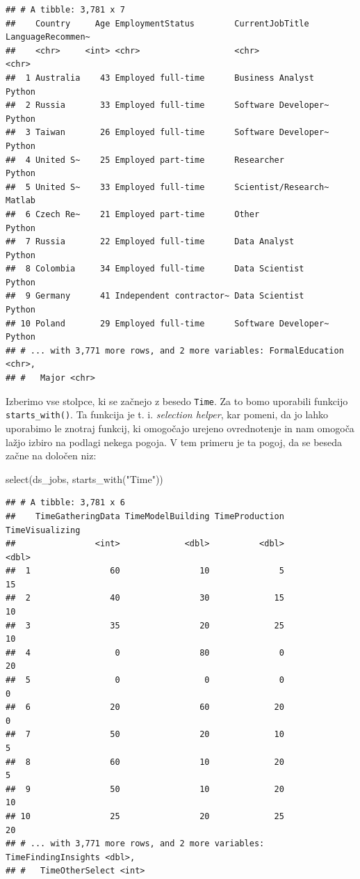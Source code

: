 \documentclass[
]{book}
\newenvironment{Shaded}{\begin{snugshade}}{\end{snugshade}}
\newcommand{\FunctionTok}[1]{\textcolor[rgb]{0.00,0.00,0.00}{#1}}
\newcommand{\NormalTok}[1]{#1}
\newcommand{\StringTok}[1]{\textcolor[rgb]{0.31,0.60,0.02}{#1}}
\begin{document}
\begin{verbatim}
## # A tibble: 3,781 x 7
##    Country     Age EmploymentStatus        CurrentJobTitle     LanguageRecommen~
##    <chr>     <int> <chr>                   <chr>               <chr>            
##  1 Australia    43 Employed full-time      Business Analyst    Python           
##  2 Russia       33 Employed full-time      Software Developer~ Python           
##  3 Taiwan       26 Employed full-time      Software Developer~ Python           
##  4 United S~    25 Employed part-time      Researcher          Python           
##  5 United S~    33 Employed full-time      Scientist/Research~ Matlab           
##  6 Czech Re~    21 Employed part-time      Other               Python           
##  7 Russia       22 Employed full-time      Data Analyst        Python           
##  8 Colombia     34 Employed full-time      Data Scientist      Python           
##  9 Germany      41 Independent contractor~ Data Scientist      Python           
## 10 Poland       29 Employed full-time      Software Developer~ Python           
## # ... with 3,771 more rows, and 2 more variables: FormalEducation <chr>,
## #   Major <chr>
\end{verbatim}

Izberimo vse stolpce, ki se začnejo z besedo \texttt{Time}. Za to bomo uporabili funkcijo \texttt{starts\_with()}. Ta funkcija je t. i. \emph{selection helper}, kar pomeni, da jo lahko uporabimo le znotraj funkcij, ki omogočajo urejeno ovrednotenje in nam omogoča lažjo izbiro na podlagi nekega pogoja. V tem primeru je ta pogoj, da se beseda začne na določen niz:

\begin{Shaded}
\begin{Highlighting}[]
\FunctionTok{select}\NormalTok{(ds\_jobs, }\FunctionTok{starts\_with}\NormalTok{(}\StringTok{"Time"}\NormalTok{))}
\end{Highlighting}
\end{Shaded}

\begin{verbatim}
## # A tibble: 3,781 x 6
##    TimeGatheringData TimeModelBuilding TimeProduction TimeVisualizing
##                <int>             <dbl>          <dbl>           <dbl>
##  1                60                10              5              15
##  2                40                30             15              10
##  3                35                20             25              10
##  4                 0                80              0              20
##  5                 0                 0              0               0
##  6                20                60             20               0
##  7                50                20             10               5
##  8                60                10             20               5
##  9                50                10             20              10
## 10                25                20             25              20
## # ... with 3,771 more rows, and 2 more variables: TimeFindingInsights <dbl>,
## #   TimeOtherSelect <int>
\end{verbatim}
\end{document}
